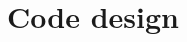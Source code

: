 \documentclass[utf8, a4paper, final, crop]{frontiersSCNS} %
\begin{document}
%
%

\section{Code design}
\end{document}
